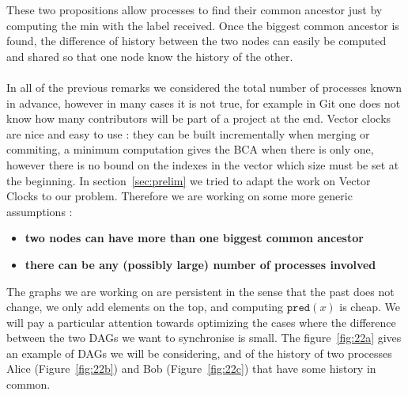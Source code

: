 These two propositions allow processes to find their common ancestor just by computing the min with the label received. Once the biggest common ancestor is found, the difference of history between the two nodes can easily be computed and shared so that one node know the history of the other.
\paragraph{} In all of the previous remarks we considered the total number of processes known in advance, however in many cases it is not true, for example in Git one does not know how many contributors will be part of a project at the end. Vector clocks are nice and easy to use : they can be built incrementally when merging or commiting, a minimum computation gives the BCA when there is only one, however there is no bound on the indexes in the vector which size must be set at the beginning. In section~\ref{sec:prelim} we tried to adapt the work on Vector Clocks to our problem. Therefore we are working on some more generic assumptions : 
\begin{itemize}
 \item \textbf{two nodes can have more than one biggest common ancestor}
 \item \textbf{there can be any (possibly large) number of processes involved}
\end{itemize}
The graphs we are working on are persistent in the sense that the past does not change, we only add elements on the top, and computing $\texttt{pred}(x)$ is cheap. We will pay a particular attention towards optimizing the cases where the difference between the two DAGs we want to synchronise is small.
The figure~\ref{fig:22a} gives an example of DAGs we will be considering, and of the history of two processes Alice (Figure~\ref{fig:22b}) and 
Bob (Figure~\ref{fig:22c}) that have some history in common.

